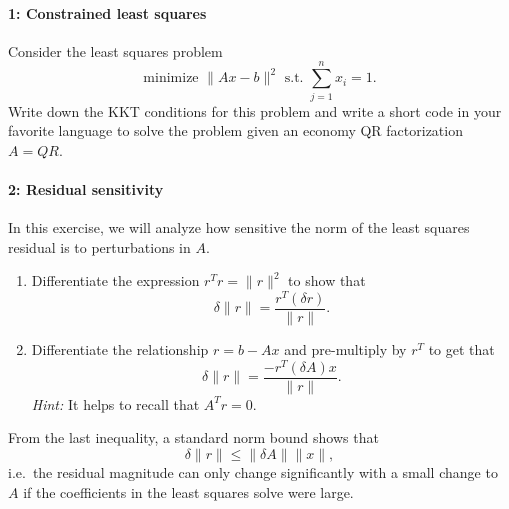 \documentclass[12pt, leqno]{article} %
\begin{document}

\paragraph*{1: Constrained least squares}
Consider the least squares problem
\[
  \mbox{minimize } \|Ax-b\|^2 \mbox{ s.t. } \sum_{j=1}^n x_i = 1.
\]
Write down the KKT conditions for this problem and write a short code
in your favorite language to solve the problem given an economy QR
factorization $A = QR$.

\paragraph*{2: Residual sensitivity}
In this exercise, we will analyze how sensitive the norm of the least
squares residual is to perturbations in $A$.
\begin{enumerate}
\item
  Differentiate the expression $r^T r = \|r\|^2$ to show that
  \[
    \delta \|r\| = \frac{r^T (\delta r)}{\|r\|}.
  \]
\item
  Differentiate the relationship $r = b-Ax$ and pre-multiply by $r^T$
  to get that
  \[
    \delta \|r\| = \frac{-r^T (\delta A) x}{\|r\|}.
  \]
  {\em Hint:} It helps to recall that $A^T r = 0$.
\end{enumerate}
From the last inequality, a standard norm bound shows that
\[
  \delta \|r\| \leq \|\delta A\| \|x\|,
\]
i.e.~the residual magnitude can only change significantly with a small
change to $A$ if the coefficients in the least squares solve were large.
\end{document}
